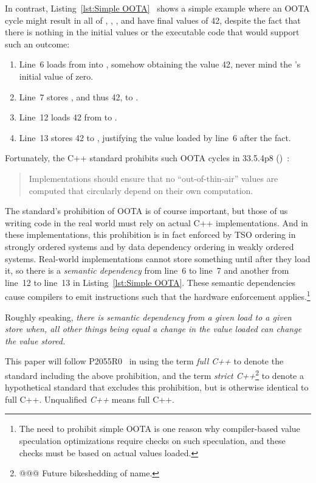\documentclass[10]{article}
\begin{document}
In contrast,
Listing~\ref{lst:Simple OOTA}~\cite{PaulEMcKenney2020RelaxedGuideRelaxed}
shows a simple example where an OOTA cycle might result in all of ,
, , and  have final values of 42, despite the fact
that there is nothing in the initial values or the executable code that
would support such an outcome:

\begin{enumerate}
\item   Line~6 loads from  into , somehow obtaining the
	value 42, never mind the 's initial value of zero.
\item   Line~7 stores , and thus 42, to .
\item   Line~12 loads 42 from  to .
\item   Line~13 stores 42 to , justifying the value loaded by
	line~6 after the fact.
\end{enumerate}

Fortunately, the C++ standard prohibits such OOTA cycles in 33.5.4p8
()~\cite{ThomasKoeppe2023N4950}:

\begin{quote}
	Implementations should ensure that no “out-of-thin-air” values
	are computed that circularly depend on their own computation.
\end{quote}

The standard's prohibition of OOTA is of course important, but those of us
writing code in the real world must rely on actual C++ implementations.
And in these implementations, this prohibition is in fact enforced by TSO
ordering in strongly ordered systems and by data dependency ordering in
weakly ordered systems.
Real-world implementations cannot store something until after they load
it, so there is a \emph{semantic dependency} from line~6 to line~7 and
another from line~12 to line~13 in
Listing~\ref{lst:Simple OOTA}.
These semantic dependencies cause compilers to emit instructions such
that the hardware enforcement applies.\footnote{
	The need to prohibit simple OOTA is one reason why compiler-based
	value speculation optimizations require checks on such
	speculation, and these checks must be based on actual values
	loaded.}

Roughly speaking, \emph{there is semantic dependency from a given load
to a given store when, all other things being equal a change in the
value loaded can change the value stored.}

This paper will follow P2055R0~\cite{PaulEMcKenney2020RelaxedGuideRelaxed}
in using the term \emph{full C++} to denote the standard including the
above prohibition, and the term \emph{strict C++}\footnote{
	@@@ Future bikeshedding of name.}
to denote a hypothetical standard that excludes this prohibition, but
is otherwise identical to full C++.
Unqualified \emph{C++} means full C++.
\end{document}
